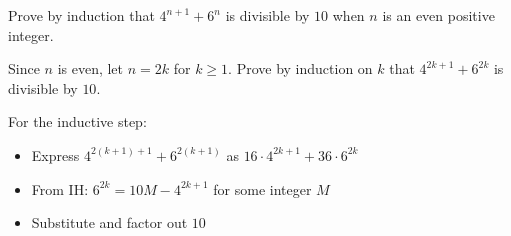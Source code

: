 
\begin{problem}
Prove by induction that $4^{n+1} + 6^n$ is divisible by $10$ when $n$ is an even positive integer.
\end{problem}

\begin{hint}
Since $n$ is even, let $n = 2k$ for $k \geq 1$. Prove by induction on $k$ that $4^{2k+1} + 6^{2k}$ is divisible by $10$.

For the inductive step:
\begin{itemize}
\item Express $4^{2(k+1)+1} + 6^{2(k+1)}$ as $16 \cdot 4^{2k+1} + 36 \cdot 6^{2k}$
\item From IH: $6^{2k} = 10M - 4^{2k+1}$ for some integer $M$
\item Substitute and factor out $10$
\end{itemize}
\end{hint}

